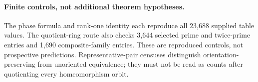 \paragraph{Finite controls, not additional theorem hypotheses.}
The phase formula and rank-one identity each reproduce all 23,688 supplied
table values. The quotient-ring route also checks 3,644 selected prime and
twice-prime entries and 1,690 composite-family entries. These are
reproduced controls, not prospective predictions. Representative-pair
censuses distinguish orientation-preserving from unoriented equivalence;
they must not be read as counts after quotienting every homeomorphism orbit.
